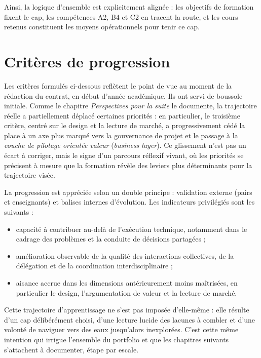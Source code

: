 Ainsi, la logique d'ensemble est explicitement alignée : les objectifs de formation fixent le cap, les compétences A2, B4 et C2 en tracent la route, et les cours retenus constituent les moyens opérationnels pour tenir ce cap.

\section{Critères de progression}

Les critères formulés ci-dessous reflètent le point de vue au moment de la rédaction du contrat, en début d'année académique. Ils ont servi de boussole initiale. Comme le chapitre \textit{Perspectives pour la suite} le documente, la trajectoire réelle a partiellement déplacé certaines priorités : en particulier, le troisième critère, centré sur le design et la lecture de marché, a progressivement cédé la place à un axe plus marqué vers la gouvernance de projet et le passage à la \emph{couche de pilotage orientée valeur} (\textit{business layer}). Ce glissement n'est pas un écart à corriger, mais le signe d'un parcours réflexif vivant, où les priorités se précisent à mesure que la formation révèle des leviers plus déterminants pour la trajectoire visée.

La progression est appréciée selon un double principe : validation externe (pairs et enseignants) et balises internes d'évolution. Les indicateurs privilégiés sont les suivants :

\begin{itemize}
    \item capacité à contribuer au-delà de l'exécution technique, notamment dans le cadrage des problèmes et la conduite de décisions partagées ;
    \item amélioration observable de la qualité des interactions collectives, de la délégation et de la coordination interdisciplinaire ;
    \item aisance accrue dans les dimensions antérieurement moins maîtrisées, en particulier le design, l'argumentation de valeur et la lecture de marché.
\end{itemize}

Cette trajectoire d'apprentissage ne s'est pas imposée d'elle-même : elle résulte d'un cap délibérément choisi, d'une lecture lucide des lacunes à combler et d'une volonté de naviguer vers des eaux jusqu'alors inexplorées. C'est cette même intention qui irrigue l'ensemble du portfolio et que les chapitres suivants s'attachent à documenter, étape par escale.

\clearpage
\ClearShipoutPictureBG
